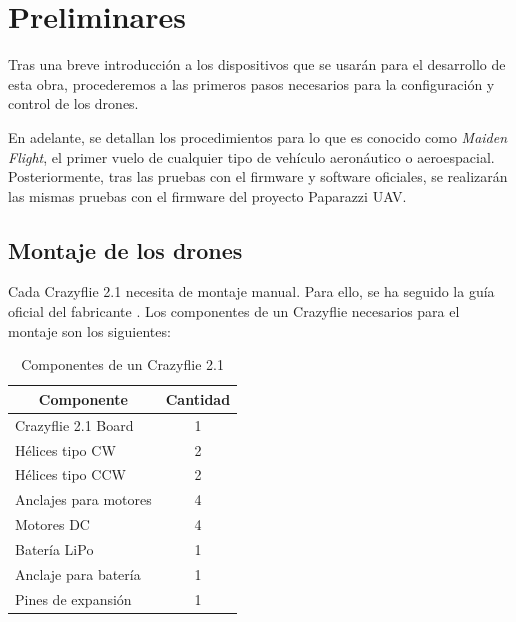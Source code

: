 \chapter{Preliminares}

Tras una breve introducción a los dispositivos que se usarán para el desarrollo de esta obra, procederemos a las primeros pasos necesarios para la configuración y control de los drones.

En adelante, se detallan los procedimientos para lo que es conocido como \textit{Maiden Flight}, 
el primer vuelo de cualquier tipo de vehículo aeronáutico o aeroespacial. 
Posteriormente, tras las pruebas con el firmware y software oficiales, se realizarán las mismas pruebas con el firmware del proyecto Paparazzi UAV.


\section{Montaje de los drones}

Cada Crazyflie 2.1 necesita de montaje manual. Para ello, se ha seguido la guía oficial del fabricante \cite{crazyflie_assembly_and_quickstart}.
Los componentes de un Crazyflie necesarios para el montaje son los siguientes:

\begin{table}[h]
\centering
\begin{tabular}{l|c}
    \multicolumn{1}{c|}{\textbf{Componente}} & \textbf{Cantidad} \\ \hline
    Crazyflie 2.1 Board             & 1        \\
    Hélices tipo CW                 & 2        \\
    Hélices tipo CCW                & 2        \\
    Anclajes para motores           & 4        \\
    Motores DC                      & 4        \\
    Batería LiPo                    & 1        \\
    Anclaje para batería            & 1        \\
    Pines de expansión              & 1       
\end{tabular}
    \caption{Componentes de un Crazyflie 2.1}
    \label{tab:componentes_crazyflie}
\end{table}

